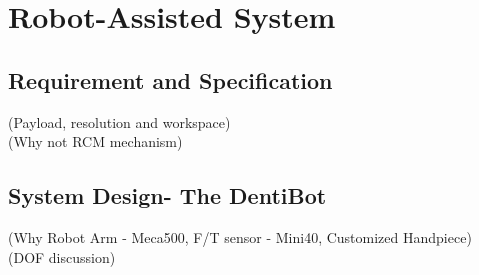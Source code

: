 \chapter{Robot-Assisted System}
\section{Requirement and Specification}
(Payload, resolution and workspace)														\\
(Why not RCM mechanism)																	
\section{System Design- The DentiBot}
(Why Robot Arm - Meca500, F/T sensor - Mini40, Customized Handpiece)					\\
(DOF discussion)																		